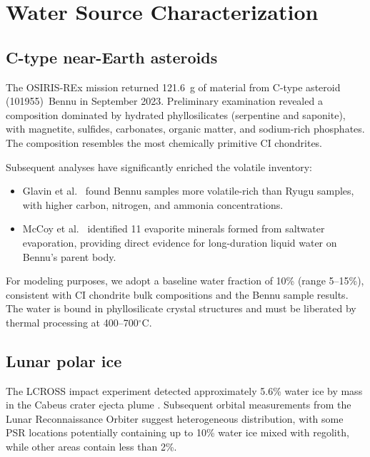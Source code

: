 \documentclass[preprint,12pt]{elsarticle}
\begin{document}
\section{Water Source Characterization}
\label{sec:sources}

\subsection{C-type near-Earth asteroids}
\label{sec:asteroid}

The OSIRIS-REx mission returned 121.6~g of material from C-type asteroid (101955)~Bennu in September 2023. Preliminary examination \cite{lauretta2024} revealed a composition dominated by hydrated phyllosilicates (serpentine and saponite), with magnetite, sulfides, carbonates, organic matter, and sodium-rich phosphates. The composition resembles the most chemically primitive CI chondrites.

Subsequent analyses have significantly enriched the volatile inventory:
\begin{itemize}
    \item Glavin et al.\ \cite{glavin2025} found Bennu samples more volatile-rich than Ryugu samples, with higher carbon, nitrogen, and ammonia concentrations.
    \item McCoy et al.\ \cite{mccoy2025} identified 11 evaporite minerals formed from saltwater evaporation, providing direct evidence for long-duration liquid water on Bennu's parent body.
\end{itemize}

For modeling purposes, we adopt a baseline water fraction of 10\% (range 5--15\%), consistent with CI chondrite bulk compositions and the Bennu sample results. The water is bound in phyllosilicate crystal structures and must be liberated by thermal processing at 400--700$^\circ$C.

\subsection{Lunar polar ice}
\label{sec:lunar}

The LCROSS impact experiment detected approximately 5.6\% water ice by mass in the Cabeus crater ejecta plume \cite{colaprete2010}. Subsequent orbital measurements from the Lunar Reconnaissance Orbiter suggest heterogeneous distribution, with some PSR locations potentially containing up to 10\% water ice mixed with regolith, while other areas contain less than 2\%.
\end{document}
